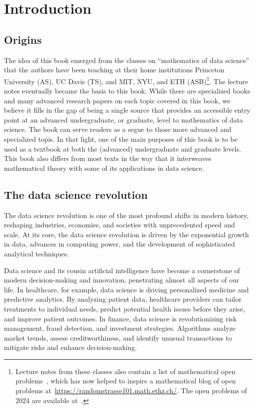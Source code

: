 \chapter{Introduction}\label{c:introduction}




\section{Origins}

The idea of this book emerged from the classes on ``mathematics of data science'' that the authors have been teaching at their home
institutions Princeton University (AS), UC Davis (TS), and MIT, NYU, and ETH (ASB)\footnote{Lecture notes from these classes also
contain a list of mathematical open problems~\cite{Afonso_10L42P}, which has now helped to inspire a mathematical blog of open problems at~\url{https://randomstrasse101.math.ethz.ch/}. The open problems of 2024 are available at~\cite{RandomstrasseProblems2024}.}. The lecture notes eventually became the basis to this book. While there are specialized books and many advanced research papers on each topic covered in this book, we believe it fills in the gap of being a single source that provides an accessible entry point at an advanced undergraduate, or graduate, level to mathematics of data science. The book can serve readers as a segue to those more advanced and specialized topis. In that light, one of the main purposes of this book is to be used as a textbook at both the (advanced) undergraduate and graduate levels. This book also differs from most texts in the way that it interweaves mathematical theory with some of its applications in data science.

\section{The data science revolution}

The data science revolution is one of the most profound shifts in modern history, reshaping industries, economies, and societies with unprecedented speed and scale.
At its core, the data science revolution is driven by the exponential growth in data, advances in computing power, and the development of sophisticated analytical techniques.

Data science and its cousin artificial intelligence have  become a cornerstone of modern decision-making and innovation, penetrating almost all aspects of our life.
In healthcare, for example, data science is driving personalized medicine and predictive analytics. By analyzing patient data, healthcare providers can tailor treatments to individual needs, predict potential health issues before they arise, and improve patient outcomes.
In finance, data science is revolutionizing risk management, fraud detection, and investment strategies. Algorithms analyze market trends, assess creditworthiness, and identify unusual transactions to mitigate risks and enhance decision-making.

